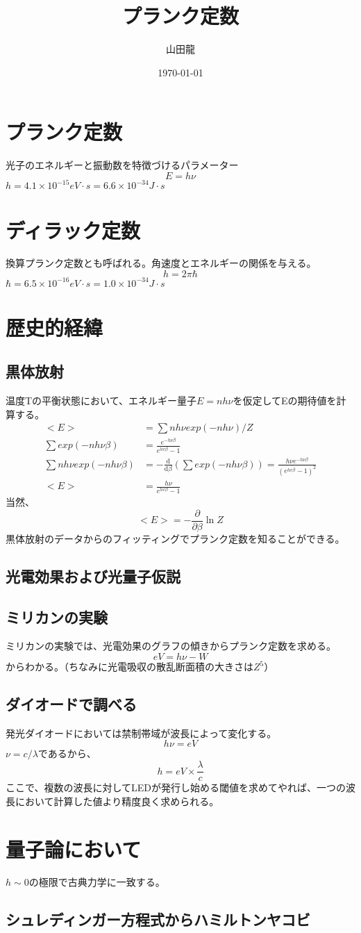 \documentclass{jsarticle}
\date{\today}
\author{山田龍}
\title{プランク定数}
\newcommand{\pder}[2][]{\frac{\partial#1}{\partial#2}}
\newcommand{\dder}[2][]{\frac{\mathrm{d}#1}{\mathrm{d}#2}}
\newcommand{\beq}{\begin{equation}}
\newcommand{\eeq}{\end{equation}}
\begin{document}
\maketitle
\section{プランク定数}
光子のエネルギーと振動数を特徴づけるパラメーター
\beq
E = h \nu
\eeq
$h = 4.1 \times 10^{-15} eV \cdot s = 6.6 \times 10^{-34} J \cdot s$
\section{ディラック定数}
換算プランク定数とも呼ばれる。角速度とエネルギーの関係を与える。
\beq
h = 2 \pi \hbar
\eeq
$\hbar = 6.5 \times 10^{-16} eV \cdot s = 1.0 \times 10^{-34} J \cdot s$
\section{歴史的経緯}
\subsection{黒体放射}
温度Tの平衡状態において、エネルギー量子$E =nh\nu$を仮定してEの期待値を計算する。
\begin{align}
    <E> &= \sum nh\nu exp(- nh\nu) / Z\\
    \sum exp(- nh\nu \beta) &=  \frac{e^{-h\nu \beta}}{e^{hv \beta} - 1}\\
    \sum nh\nu exp(- nh\nu\beta) &= - \dder[]{\beta} (\sum exp(-nh\nu \beta)) = \frac{h\nu e^{-h\nu \beta}}{(e^{hv \beta} - 1)^2}\\
    <E> &= \frac{h\nu}{e^{hv \beta} - 1}
\end{align}
当然、
\beq
<E> = - \pder[]{\beta} \ln Z
\eeq
黒体放射のデータからのフィッティングでプランク定数を知ることができる。
\subsection{光電効果および光量子仮説}
\subsection{ミリカンの実験}
ミリカンの実験では、光電効果のグラフの傾きからプランク定数を求める。
\beq
eV = h\nu - W
\eeq
からわかる。（ちなみに光電吸収の散乱断面積の大きさは$Z^5$）
\subsection{ダイオードで調べる}
発光ダイオードにおいては禁制帯域が波長によって変化する。
\beq 
h \nu = eV
\eeq
$\nu = c / \lambda$であるから、
\beq
h = eV \times \frac{\lambda}{c}
\eeq
ここで、複数の波長に対してLEDが発行し始める閾値を求めてやれば、一つの波長において計算した値より精度良く求められる。
\section{量子論において}
$h \sim 0$の極限で古典力学に一致する。
\subsection{シュレディンガー方程式からハミルトンヤコビ}
\end{document}
